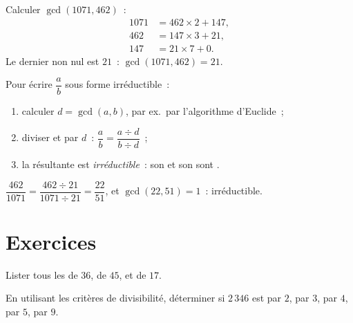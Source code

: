\begin{example}\label{ex:g9:arith:euclidalgo}
Calculer $\gcd(1071, 462)$~:
\begin{align*}
1071 &= 462 \times 2 + 147, \\
462 &= 147 \times 3 + 21, \\
147 &= 21 \times 7 + 0 .
\end{align*}
Le dernier  non nul est $21$~: $\gcd(1071, 462) = 21$.
\end{example}

\begin{method}\label{met:g9:arith:simplify}
Pour écrire $\dfrac ab$ sous forme irréductible~:
\begin{enumerate}
  \item calculer $d = \gcd(a, b)$, par ex.\ par l'algorithme d'Euclide~;
  \item diviser  et  par $d$~:
        $\dfrac ab = \dfrac{a \div d}{b \div d}$~;
  \item la  résultante est \emph{irréductible}~: son 
        et son  sont .
\end{enumerate}
\end{method}

\begin{example}
$\dfrac{462}{1071} = \dfrac{462 \div 21}{1071 \div 21} = \dfrac{22}{51}$,
et $\gcd(22, 51) = 1$~: irréductible.
\end{example}

\section{Exercices}

\begin{exercise}[$\star$]\label{exo:g9:arith:1}
Lister tous les  de $36$, de $45$, et de $17$.
\end{exercise}

\begin{exercise}[$\star$]\label{exo:g9:arith:2}
En utilisant les critères de divisibilité, déterminer si $2\,346$ est
 par $2$, par $3$, par $4$, par $5$, par $9$.
\end{exercise}

